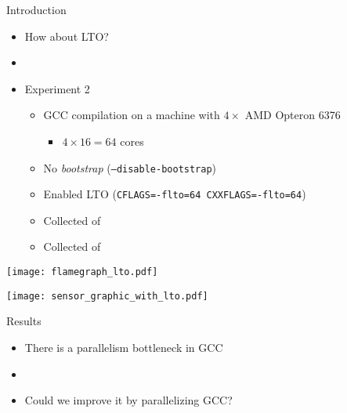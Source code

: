 \begin{frame}{Introduction}
    \begin{itemize}
        \item How about LTO?
        \item[]
        \item Experiment 2
        \begin{itemize}
            \item GCC compilation on a machine with $4\times$ AMD Opteron 6376
                \begin{itemize}
                    \item $4 \times 16 = 64$ cores
                \end{itemize}
            \item No \textit{bootstrap} (\texttt{--disable-bootstrap})
            \item Enabled LTO (\texttt{CFLAGS=-flto=64 CXXFLAGS=-flto=64})
            \item Collected {\color{blue}{Compilation Time}} of {\color{red}{each file}}
            \item Collected {\color{blue}{Consumed Energy}} of {\color{red}{all CPUs}}
        \end{itemize}
    \end{itemize}
\end{frame}

\begin{frame}
    \texttt{[image: flamegraph\_lto.pdf]}
    \label{fig:analysis_lto}
\end{frame}

\begin{frame}
    \centering
    \texttt{[image: sensor\_graphic\_with\_lto.pdf]}
    \label{fig:sensor_graphic_lto}
\end{frame}


\begin{frame}{Results}
    \begin{itemize}
        \item There is a parallelism bottleneck in GCC
        \item[]
        \item Could we improve it by parallelizing GCC?
    \end{itemize}
\end{frame}

